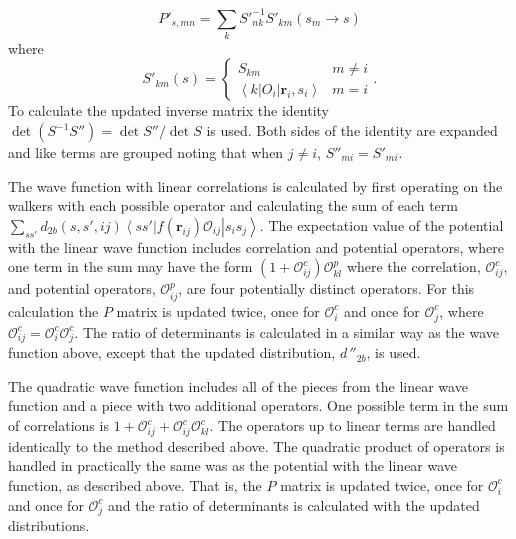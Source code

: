 \documentclass[aps,prc,twocolumn,superscriptaddress,floatfix]{revtex4-1}
\begin{document}
\begin{equation}
   P'_{s,mn}=\sum\limits_k S'^{-1}_{nk}S'_{km}(s_m\rightarrow s)
\end{equation}
where
\begin{equation}
   S'_{km}(s) = \left\{
   \begin{array}{cc}
      S_{km} & m \ne i\\
      \left<k\right|O_i\left|\mathbf{r}_i,s_i\right> & m = i
   \end{array}.
   \right.
\end{equation}
To calculate the updated inverse matrix the identity $\det(S^{-1}S'')=\det S''/\det S$ is used. Both sides of the identity are expanded and like terms are grouped noting that when $j \ne i$, $S''_{mi}=S'_{mi}$.

The wave function with linear correlations is calculated by first operating on the walkers with each possible operator and calculating the sum of each term $\sum\limits_{ss'}d_{2b}(s,s',ij)\left<ss'\right|f(\mathbf{r}_{ij})\mathcal{O}_{ij}\left|s_is_j\right>$. The expectation value of the potential with the linear wave function includes correlation and potential operators, where one term in the sum may have the form $\left(1+\mathcal{O}^c_{ij}\right)\mathcal{O}^p_{kl}$ where the correlation, $\mathcal{O}^c_{ij}$, and potential operators, $\mathcal{O}^p_{ij}$, are four potentially distinct operators. For this calculation the $P$ matrix is updated twice, once for $\mathcal{O}^c_i$ and once for $\mathcal{O}^c_j$, where $\mathcal{O}^c_{ij}=\mathcal{O}^c_i\mathcal{O}^c_j$. The ratio of determinants is calculated in a similar way as the wave function above, except that the updated distribution, $d\,''_{2b}$, is used.

The quadratic wave function includes all of the pieces from the linear wave function and a piece with two additional operators. One possible term in the sum of correlations is $1+\mathcal{O}^c_{ij}+\mathcal{O}^c_{ij}\mathcal{O}^c_{kl}$. The operators up to linear terms are handled identically to the method described above. The quadratic product of operators is handled in practically the same was as the potential with the linear wave function, as described above. That is, the $P$ matrix is updated twice, once for $\mathcal{O}^c_i$ and once for $\mathcal{O}^c_j$ and the ratio of determinants is calculated with the updated distributions. %
\end{document}

